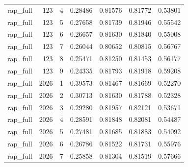 \begin{tabular}{lrrrrrr}
rap_full & 123 & 4 & 0.28486 & 0.81576 & 0.81772 & 0.53801 \\
rap_full & 123 & 5 & 0.27658 & 0.81739 & 0.81946 & 0.55542 \\
rap_full & 123 & 6 & 0.26657 & 0.81630 & 0.81840 & 0.55008 \\
rap_full & 123 & 7 & 0.26044 & 0.80652 & 0.80815 & 0.56767 \\
rap_full & 123 & 8 & 0.25471 & 0.81250 & 0.81453 & 0.56177 \\
rap_full & 123 & 9 & 0.24335 & 0.81793 & 0.81918 & 0.59208 \\
rap_full & 2026 & 1 & 0.39573 & 0.81467 & 0.81669 & 0.52270 \\
rap_full & 2026 & 2 & 0.30713 & 0.81630 & 0.81788 & 0.52328 \\
rap_full & 2026 & 3 & 0.29280 & 0.81957 & 0.82121 & 0.53671 \\
rap_full & 2026 & 4 & 0.28591 & 0.81848 & 0.82081 & 0.54487 \\
rap_full & 2026 & 5 & 0.27481 & 0.81685 & 0.81883 & 0.54092 \\
rap_full & 2026 & 6 & 0.26786 & 0.81522 & 0.81731 & 0.55976 \\
rap_full & 2026 & 7 & 0.25858 & 0.81304 & 0.81519 & 0.57666 \\
\bottomrule
\end{tabular}
